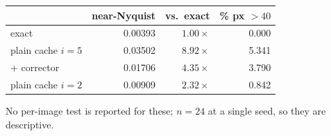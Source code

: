 \begin{table}[h]
\centering\small
\begin{tabular}{lrrr}
\toprule
 & near-Nyquist & vs.\ exact & \% px $>40$ \\
\midrule
exact & 0.00393 & $1.00\times$ & 0.000 \\
plain cache $i{=}5$ & 0.03502 & $8.92\times$ & 5.341 \\
$+$ corrector & 0.01706 & $4.35\times$ & 3.790 \\
plain cache $i{=}2$ & 0.00909 & $2.32\times$ & 0.842 \\
\bottomrule
\end{tabular}
\end{table}

No per-image test is reported for these; $n{=}24$ at a single seed, so they are
descriptive.
\label{app:artefacts}
